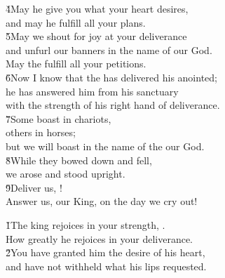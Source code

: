 \begin{poetry}
\poeml \v{4}May he give you what your heart desires, \\
\poemll    and may he fulfill all your plans. \\
\poeml \v{5}May we shout for joy at your deliverance \\
\poemll    and unfurl our banners in the name of our God. \\
\poemlll       May the  fulfill all your petitions. \\
\poeml \v{6}Now I know that the  has delivered his anointed; \\
\poemll    he has answered him from his sanctuary \\
\poemlll       with the strength of his right hand of deliverance. \\
\poeml \v{7}Some boast in chariots, \\
\poemll    others in horses; \\
\poemlll       but we will boast in the name of the  our God. \\
\poeml \v{8}While they bowed down and fell, \\
\poemll    we arose and stood upright. \\
\poeml \v{9}Deliver us, ! \\
\poemll    Answer us, our King, on the day we cry out!
\end{poetry}

\begin{poetry}
\poeml \v{1}The king rejoices in your strength, . \\
\poemll    How greatly he rejoices in your deliverance. \\
\poeml \v{2}You have granted him the desire of his heart, \\
\poemll    and have not withheld what his lips requested.
\end{poetry}


